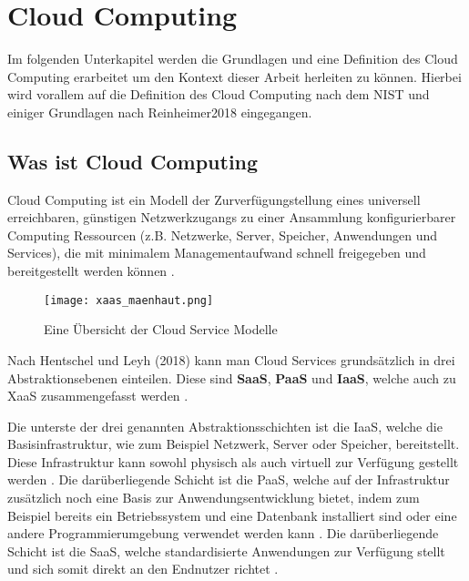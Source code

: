 \section{Cloud Computing}

Im folgenden Unterkapitel werden die Grundlagen und eine Definition des Cloud Computing erarbeitet um den Kontext dieser Arbeit herleiten zu können.
Hierbei wird vorallem auf die Definition des Cloud Computing nach dem NIST und einiger Grundlagen nach Reinheimer2018 eingegangen.

\subsection{Was ist Cloud Computing}

Cloud Computing ist ein Modell der Zurverfügungstellung eines universell erreichbaren,
günstigen Netzwerkzugangs zu einer Ansammlung konfigurierbarer Computing Ressourcen
(z.B. Netzwerke, Server, Speicher, Anwendungen und Services), die mit minimalem Managementaufwand schnell freigegeben und bereitgestellt werden können
\cite[Vgl.][S. 2]{Mell2011}.

\begin{wrapfigure}{r}{0.45\textwidth}
\centering
\texttt{[image: xaas\_maenhaut.png]}
\caption{Eine Übersicht der Cloud Service Modelle \cite[S. 33]{Maenhaut2016}}
\label{fig:XaaS}
\end{wrapfigure}

Nach Hentschel und Leyh (2018) kann man Cloud Services grundsätzlich in drei Abstraktionsebenen einteilen. Diese sind \textbf{\acf{SaaS}},
\textbf{\acf{PaaS}} und \textbf{\acf{IaaS}}, welche auch zu \acf{XaaS} zusammengefasst werden
\cite[Vgl.][S. 9]{Reinheimer2018}.

Die unterste der drei genannten Abstraktionsschichten ist die \ac{IaaS}, welche die Basisinfrastruktur, wie zum Beispiel Netzwerk, Server oder Speicher,
bereitstellt. Diese Infrastruktur kann sowohl physisch als auch virtuell zur Verfügung gestellt werden \cite[Vgl.][S. 9f]{Reinheimer2018}.
Die darüberliegende Schicht ist die \ac{PaaS}, welche auf der Infrastruktur zusätzlich noch eine Basis zur Anwendungsentwicklung bietet, indem zum Beispiel
bereits ein Betriebssystem und eine Datenbank installiert sind oder eine andere Programmierumgebung verwendet werden kann \cite[Vgl.][S. 10]{Reinheimer2018}.
Die darüberliegende Schicht ist die \ac{SaaS}, welche standardisierte Anwendungen zur Verfügung stellt und sich somit direkt an den Endnutzer richtet
\cite[Vgl.][S. 11]{Reinheimer2018}.

